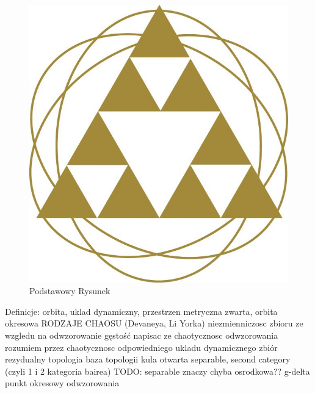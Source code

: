 \documentclass[licencjacka]{pwr_wmat_praca_dyplomowa}
\theoremstyle{plain}
\numberwithin{theorem}{chapter}
\theoremstyle{definition}
\numberwithin{theorem}{chapter}
\begin{document}
\begin{figure}[ht]

\centering
                     
\includegraphics[scale=0.27]{logo_w13.jpg}
\caption{Podstawowy Rysunek}\label{rys1}
\end{figure}
\label{rys:przykladowy} 


Definicje:
orbita,
uklad dynamiczny,
przestrzen metryczna zwarta,
orbita okresowa
RODZAJE CHAOSU (Devaneya, Li Yorka)
niezmienniczosc zbioru ze wzgledu na odwzorowanie
gęstość
napisac ze chaotycznosc odwzorowania rozumiem przez chaotycznosc odpowiedniego ukladu dynamicznego
zbiór rezydualny
topologia
baza topologii
kula otwarta
separable, second category (czyli 1 i 2 kategoria bairea)
TODO: separable znaczy chyba osrodkowa??
g-delta
punkt okresowy odwzorowania
\end{document}
